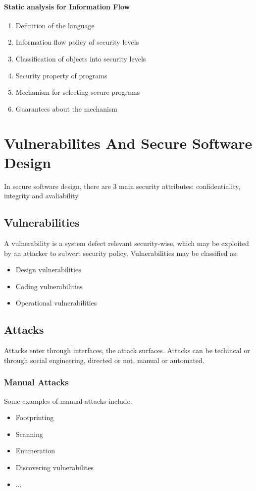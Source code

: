 \documentclass[10pt,a4paper]{report}
\begin{document}
\subsubsection{Static analysis for Information Flow}
\begin{enumerate}
\item Definition of the language
\item Information flow policy of security levels
\item Classification of objects into security levels
\item Security property of programs
\item Mechanism for selecting secure programs
\item Guarantees about the mechanism
\end{enumerate}

\chapter{Vulnerabilites And Secure Software Design}
In secure software design, there are 3 main security attributes: confidentiality, integrity and avaliability.
\section{Vulnerabilities}
A vulnerability is a system defect relevant security-wise, which may be exploited by an attacker to subvert security policy. Vulnerabilities may be classified as:
\begin{itemize}
\item Design vulnerabilities
\item Coding vulnerabilities
\item Operational vulnerabilities
\end{itemize}
\section{Attacks}
Attacks enter through interfaces, the attack surfaces. Attacks can be techincal or through social engineering, directed or not, manual or automated.
\subsection{Manual Attacks}
Some examples of manual attacks include:
\begin{itemize}
\item Footprinting
\item Scanning
\item Enumeration
\item Discovering vulnerabilites
\item ...
\end{itemize}
\end{document}
